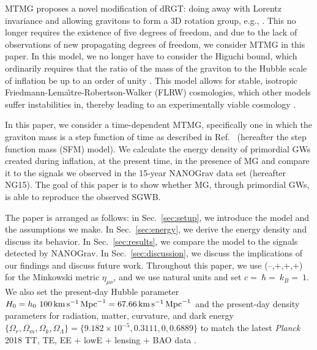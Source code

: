 \documentclass[prd,twocolumn,aps,psfig,nofootinbib,nobibnotes,superscriptaddress,preprintnumbers,times]{revtex4-2}
\newcommand{\s}{\,{\rm s}}
\newcommand{\km}{\,{\rm km}}
\newcommand{\Mpc}{\,{\rm Mpc}}
\begin{document}
MTMG proposes a novel modification of dRGT: doing away with Lorentz invariance and allowing gravitons to form a 3D rotation group, e.g., \cite{Arkani-Hamed:2003pdi,Rubakov:2004eb,Dubovsky:2004sg,Blas:2009my,Rubakov:2008nh,Blas:2007zz,Comelli:2013txa,Langlois:2014jba}. This no longer requires the existence of five degrees of freedom, and due to the lack of observations of new propagating degrees of freedom, we consider MTMG in this paper. In this model, we no longer have to consider the Higuchi bound, which ordinarily requires that the ratio of the mass of the graviton to the Hubble scale of inflation be up to an order of unity \cite{Higuchi:1986py}. 
This model allows for stable, isotropic Friedmann-Lema\^{\i}tre-Robertson-Walker (FLRW) cosmologies, which other models suffer instabilities in, thereby leading to an experimentally viable cosmology \cite{DeFelice:2015hla}.

In this paper, we consider a time-dependent MTMG, specifically one in which the graviton mass is a step function of time as described in Ref.\ \cite{Fujita:2018ehq} (hereafter the step function mass (SFM) model). We calculate the energy density of primordial GWs created during inflation, at the present time, in the presence of MG and compare it to the signals we observed in the 15-year NANOGrav data set (hereafter NG15). The goal of this paper is to show whether MG, through primordial GWs, is able to reproduce the observed SGWB.

The paper is arranged as follows: in Sec.\ \ref{sec:setup}, we introduce the model and the assumptions we make. In Sec.\ \ref{sec:energy}, we derive the energy density and discuss its behavior. In Sec.\ \ref{sec:results}, we compare the model to the signals detected by NANOGrav. In Sec.\ \ref{sec:discussion}, we discuss the implications of our findings and discuss future work. Throughout this paper, we use  (--,+,+,+) for the Minkowski metric $\eta_{\mu\nu}$, and we use natural units and set $c = $$\ \hbar = $$\ k_B = $$\ 1$. We also set the present-day Hubble parameter $H_0 = h_0\ 100 \km \s^{-1}\Mpc^{-1} = 67.66 \km \s^{-1}\Mpc^{-1}$ and the present-day density parameters for radiation, matter, curvature, and dark energy $\{\Omega_r, \Omega_m, \Omega_k, \Omega_\Lambda\} = \{9.182\times10^{-5},0.3111,0,0.6889\}$ to match the latest \textit{Planck} 2018 TT, TE, EE + lowE + lensing + BAO data \cite{Planck:2018vyg}.
\end{document}
